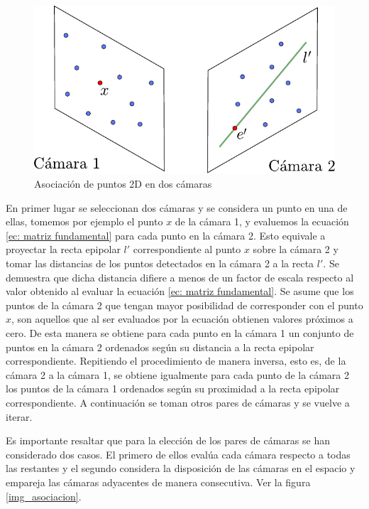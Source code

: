 \begin{figure}[H]
\begin{center}
\includegraphics[scale=0.7]{img/Reconstruccion/cam2cam.pdf}
\end{center}
\caption{Asociación de puntos 2D en dos cámaras}
\label{fig: cam2cam }
\end{figure}

En primer lugar se seleccionan dos cámaras y se considera un punto en una de ellas, tomemos por ejemplo el punto $x$ de la cámara 1, y evaluemos la ecuación \ref{ec: matriz fundamental} para cada punto en la cámara 2. Esto equivale a proyectar la recta epipolar $l'$ correspondiente al punto $x$ sobre la cámara 2  y tomar las distancias de los puntos detectados en la cámara 2 a la recta $l'$. Se demuestra que dicha distancia difiere a menos de un factor de escala respecto al valor obtenido al evaluar la ecuación \ref{ec: matriz fundamental}. Se asume que los puntos de la cámara 2 que tengan mayor posibilidad de corresponder con el punto $x$, son aquellos que al ser evaluados por la ecuación obtienen valores próximos a cero.
De esta manera se obtiene para cada punto en la cámara 1 un conjunto de puntos en la cámara 2 ordenados según su distancia a la recta epipolar correspondiente.
Repitiendo el procedimiento de manera inversa, esto es, de la cámara 2 a la cámara 1, se obtiene igualmente para cada punto de la cámara 2  los puntos de la cámara 1 ordenados según su proximidad a la recta epipolar correspondiente. A continuación se toman otros pares de cámaras y se vuelve a iterar. 

Es importante resaltar que para la elección de los pares de cámaras se han considerado dos casos.
El primero de ellos evalúa cada cámara respecto a todas las restantes y el segundo considera la disposición de las cámaras en el espacio y empareja las cámaras adyacentes de manera consecutiva. Ver la figura \ref{img_asociacion}. %


